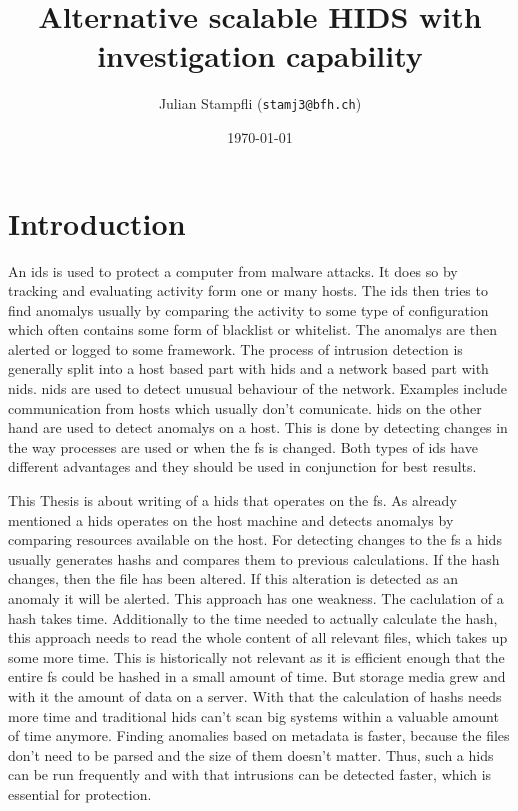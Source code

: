 \documentclass[
	a4paper,					%
	10pt,							%
	twoside,					%
	openright,				%
	notitlepage,			%
	parskip=half,			%
]{scrreprt}					%
\begin{document}
\title{Alternative scalable HIDS with investigation capability}
\date{\today} 
\author{ Julian Stampfli (\texttt{stamj3@bfh.ch}) }
\maketitle
\setcounter{tocdepth}{2}
\tableofcontents
\clearpage

\chapter{Introduction}

An \gls{ids} is used to protect a computer from \gls{malware} attacks. It does so by tracking and evaluating activity form one or many hosts. The \gls{ids} then tries to find \glspl{anomaly} usually by comparing the activity to some type of configuration which often contains some form of blacklist or whitelist. The \glspl{anomaly} are then alerted or logged to some framework. The process of intrusion detection is generally split into a host based part with \gls{hids} and a network based part with \gls{nids}. \gls{nids} are used to detect unusual behaviour of the network. Examples include communication from hosts which usually don't comunicate. \gls{hids} on the other hand are used to detect \glspl{anomaly} on a host. This is done by detecting changes in the way processes are used or when the \gls{fs} is changed. Both types of \gls{ids} have different advantages and they should be used in conjunction for best results. \cite{needed}

This Thesis is about writing of a \gls{hids} that operates on the \gls{fs}. As already mentioned a \gls{hids} operates on the host machine and detects \glspl{anomaly} by comparing resources available on the host. For detecting changes to the \gls{fs} a \gls{hids} usually generates \glspl{hash} and compares them to previous calculations. If the \gls{hash} changes, then the file has been altered. If this alteration is detected as an \gls{anomaly} it will be alerted. This approach has one weakness. The caclulation of a \gls{hash} takes time. Additionally to the time needed to actually calculate the hash, this approach needs to read the whole content of all relevant files, which takes up some more time. \cite{hash:slow, hash:speed} This is historically not relevant as it is efficient enough that the entire \gls{fs} could be hashed in a small amount of time. But storage media grew and with it the amount of data on a server. \cite{bruce:imaging} With that the calculation of \glspl{hash} needs more time and traditional \gls{hids} can't scan big systems within a valuable amount of time anymore. Finding anomalies based on \gls{metadata} is faster, because the files don't need to be parsed and the size of them doesn't matter. Thus, such a \gls{hids} can be run frequently and with that \glspl{intrusion} can be detected faster, which is essential for protection. \cite{inode}
\end{document}
